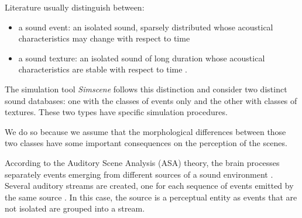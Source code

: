\documentclass[twoside,twocolumn]{article}
\begin{document}
Literature usually distinguish between:
\begin{itemize}
\item {a sound event}: an isolated sound, sparsely distributed whose acoustical characteristics may change with respect to time
\item {a sound texture}: an isolated sound of long duration whose acoustical characteristics are stable with respect to time \cite{saint1995classification}.
\end{itemize}

The simulation tool \emph{Simscene} follows this distinction and consider two distinct sound databases: one with the classes of events only and the other with classes of textures. These two types have specific simulation procedures.



We do so because we assume that the morphological differences between those two classes have some important consequences on the perception of the scenes.


According to the Auditory Scene Analysis (ASA) theory, the brain processes separately events emerging from different sources of a sound environment \cite{bregman1994auditory}. Several auditory streams are created, one for each sequence of events emitted by the same source \cite{carlyon2004brain}. In this case, the source is a perceptual entity as events that are not isolated are grouped into a stream.

\end{document}
